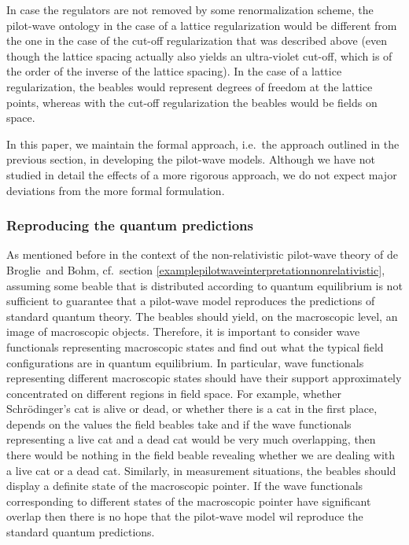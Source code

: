 \documentclass[12pt]{article}
\newcommand{\db}{de$\,$Broglie}
\begin{document}
In case the regulators are not removed by some renormalization scheme, the pilot-wave ontology in the case of a lattice regularization would be different from the one in the case of the cut-off regularization that was described above (even though the lattice spacing actually also yields an ultra-violet cut-off, which is of the order of the inverse of the lattice spacing). In the case of a lattice regularization, the beables would represent degrees of freedom at the lattice points, whereas with the cut-off regularization the beables would be fields on space. 

In this paper, we maintain the formal approach, i.e.\ the approach outlined in the previous section, in developing the pilot-wave models. Although we have not studied in detail the effects of a more rigorous approach, we do not expect major deviations from the more formal formulation. 



\subsubsection{Reproducing the quantum predictions}\label{reproducingquantumpredictions}
As mentioned before in the context of the non-relativistic pilot-wave theory of \db\ and Bohm, cf.\ section \ref{examplepilotwaveinterpretationnonrelativistic}, assuming some beable that is distributed according to quantum equilibrium is not sufficient to guarantee that a pilot-wave model reproduces the predictions of standard quantum theory. The beables should yield, on the macroscopic level, an image of macroscopic objects. Therefore, it is important to consider wave functionals representing macroscopic states and find out what the typical field configurations are in quantum equilibrium. In particular, wave functionals representing different macroscopic states should have their support approximately concentrated on different regions in field space. For example, whether Schr\"odinger's cat is alive or dead, or whether there is a cat in the first place, depends on the values the field beables take and if the wave functionals representing a live cat and a dead cat would be very much overlapping, then there would be nothing in the field beable revealing whether we are dealing with a live cat or a dead cat. Similarly, in measurement situations, the beables should display a definite state of the macroscopic pointer. If the wave functionals corresponding to different states of the macroscopic pointer have significant overlap then there is no hope that the pilot-wave model wil reproduce the standard quantum predictions. 
\end{document}
